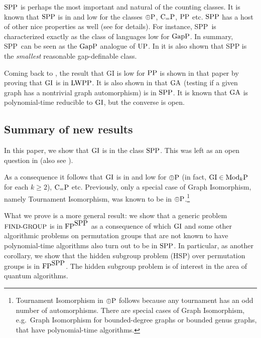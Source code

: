 \documentclass{article}
\newcommand{\UP}{\mbox{\rm UP}}
\newcommand{\PP}{\mbox{\rm PP}}
\newcommand{\GapP}{\mbox{\rm GapP}}
\newcommand{\FP}{\mbox{\rm FP}}
\newcommand{\ParityP}{\mbox{$\oplus$\rm P}}
\newcommand{\ModkP}{\mbox{\rm Mod$_k$P}}
\newcommand{\LWPP}{\mbox{\rm LWPP}}
\newcommand{\SPP}{\mbox{\rm SPP}}
\newcommand{\CeqP}{\mbox{\rm C$_=$P}}
\newcommand{\GA}{{\rm{GA}}}
\newcommand{\FINDGROUP}{\mbox{\small\rm FIND{-}GROUP}}
\newcommand{\HSP}{\mbox{\small\rm HSP}}
\newcommand{\GI}{{\rm{GI}}}
\begin{document}
$\SPP$ is perhaps the most important and natural of the counting
classes. It is known that $\SPP$ is in and low for the classes
$\ParityP$, $\CeqP$, $\PP$ etc. $\SPP$ has a host of other nice
properties as well (see \cite{fenner91gapdefinable} for details). For
instance, \SPP\ is characterized exactly as the class of languages low
for $\GapP$. In summary, \SPP\ can be seen as the $\GapP$ analogue of
$\UP$. In \cite{fenner91gapdefinable} it is also shown that SPP is the
{\em smallest} reasonable gap-definable class.

Coming back to \cite{kobler92graph}, the result that GI is low for
$\PP$ is shown in that paper by proving that $\GI$ is in $\LWPP$. It
is also shown in \cite{kobler92graph} that $\GA$ (testing if a given
graph has a nontrivial graph automorphism) is in $\SPP$. It is known
that $\GA$ is polynomial-time reducible to $\GI$, but the converse is
open.

\subsection{ Summary of new results}

In this paper, we show that $\GI$ is in the class $\SPP$. This was
left as an open question in \cite{kobler92graph} (also see 
\cite{fenner91gapdefinable}).

As a consequence it follows that $\GI$ is in and low for $\ParityP$
(in fact, $\GI\in\ModkP$ for each $k\geq 2$), $\CeqP$ etc. Previously,
only a special case of Graph Isomorphism, namely Tournament
Isomorphism, was known to be in $\ParityP$.\footnote{Tournament
  Isomorphism in $\ParityP$ follows because any tournament has an odd
  number of automorphisms. There are special cases of Graph
  Isomorphism, e.g.\ Graph Isomorphism for bounded-degree graphs or
  bounded genus graphs, that have polynomial-time algorithms.}

What we prove is a more general result: we show that a generic problem
$\FINDGROUP$ is in $\FP^{\SPP}$ as a consequence of which $\GI$ and
some other algorithmic problems on permutation groups that are not
known to have polynomial-time algorithms also turn out to be in
$\SPP$. In particular, as another corollary, we show that the hidden
subgroup problem (\HSP) over permutation groups is in $\FP^{\SPP}$.
The hidden subgroup problem is of interest in the area of quantum
algorithms.

\end{document}
